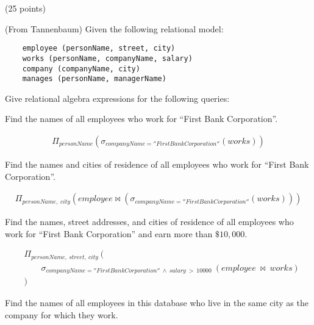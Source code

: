 \begin{problem}(25 points)

  \noindent
  (From Tannenbaum) Given the following relational model:

  \centering
  \begin{Verbatim}
    employee (personName, street, city)
    works (personName, companyName, salary)
    company (companyName, city)
    manages (personName, managerName)
  \end{Verbatim}

  \flushleft
  \noindent
  Give relational algebra expressions for the following queries:

  \begin{enumalph}
    \item Find the names of all employees who work for ``First Bank Corporation''.
    \begin{Answer}
      \begin{align*}
        \Pi_{personName}(\sigma_{companyName=''First Bank Corporation''}(works))
      \end{align*}
    \end{Answer}
    
    \item Find the names and cities of residence of all employees
    who work for ``First Bank Corporation''.
    \begin{Answer}
      \begin{align*}
        \Pi_{personName,\;city}(employee \Join (\sigma_{companyName = ''First Bank Corporation''}(works)))
      \end{align*}
    \end{Answer}
    \item Find the names, street addresses, and cities of residence
    of all employees who work for ``First Bank Corporation''
    and earn more than $\$ 10,000$.

    \begin{Answer}
      \begin{align*}
        &\Pi_{personName,\ street,\ city}\ (\\
          &\qquad \sigma_{companyName = ''First Bank Corporation''\ \wedge\ salary\ >\ 10000}\ (employee\ \Join\ works)\\
        &)
      \end{align*}
    \end{Answer}
  
    \item Find the names of all employees in this database who
    live in the same city as the company for which they work.


\end{enumalph}
\end{problem}
